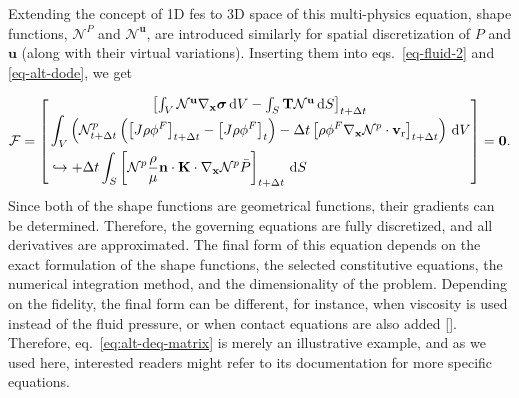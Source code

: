 Extending the concept of 1D \acp{fe} to 3D space of this multi-physics equation, shape functions, \( \mathcal{N}^P \) and \( \mathcal{N}^\mathbf{u} \), are introduced similarly for spatial discretization of \( P \) and \( \mathbf{u} \) (along with their virtual variations). Inserting them into eqs.~\ref{eq-fluid-2} and \ref{eq-alt-dode}, we get

%
\begin{equation}
    \mathcal{F} =
    \begin{bmatrix}
        \left[\int_V \mathcal{N}^\textbf{u} \nabla_\textbf{x} \boldsymbol{\sigma} \, {\mathrm d}V - \int_S \textbf{T} \mathcal{N}^\textbf{u} \, {\mathrm d}S\right]_{t+\Delta t} \\
        \begin{aligned}
            &\int_V \left ( \mathcal{N}^p_{t+\Delta t} \left( \left[ J \rho \phi^F \right]_{t+\Delta t} - \left[ J \rho \phi^F \right]_{t} \right) - \Delta t \left[ \rho \phi^F \nabla_{\mathbf{x}} \mathcal{N}^p \cdot \mathbf{v}_{\rm r} \right]_{t+\Delta t} \right) \, {\mathrm d}V \\
            &\hookrightarrow + \Delta t \int_S \left[ \mathcal{N}^p \frac{\rho}{\mu } \mathbf{n} \cdot \mathbf{K} \cdot \nabla_\mathbf{x} \mathcal{N}^p \bar{P} \right]_{t+\Delta t} \, {\mathrm d}S
        \end{aligned}
    \end{bmatrix}
    = \textbf{0}.
    \label{eq:alt-deq-matrix}
\end{equation}
%
Since both of the shape functions are geometrical functions, their gradients can be determined. Therefore, the governing equations are fully discretized, and all derivatives are approximated. The final form of this equation depends on the exact formulation of the shape functions, the selected constitutive equations, the numerical integration method, and the dimensionality of the problem. Depending on the fidelity, the final form can be different, for instance, when viscosity is used instead of the fluid pressure, or when contact equations are also added [\cite{pore2021,orava2022,orozco2022,oleg2023}]. Therefore, eq.~\ref{eq:alt-deq-matrix} is merely an illustrative example, and as we used \cite{abaqus} here, interested readers might refer to its documentation for more specific equations.

